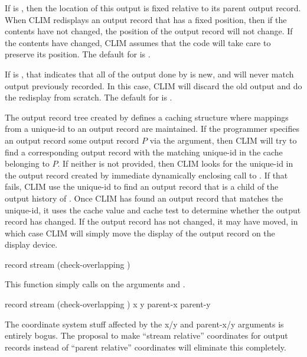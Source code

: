 If  is , then the location of this output is
fixed relative to its parent output record.  When CLIM redisplays an output
record that has a fixed position, then if the contents have not changed, the
position of the output record will not change.  If the contents have changed,
CLIM assumes that the code will take care to preserve its position.  The default
for  is .

If  is , that indicates that all of the output done by
 is new, and will never match output previously recorded.  In this
case, CLIM will discard the old output and do the redisplay from scratch.  The
default for  is .

The output record tree created by  defines a caching
structure where mappings from a unique-id to an output record are maintained.
If the programmer specifies an output record some output record $P$ via the
 argument, then CLIM will try to find a corresponding output
record with the matching unique-id in the cache belonging to $P$.  If neither
 is not provided, then CLIM looks for the unique-id in the
output record created by immediate dynamically enclosing call to
.  If that fails, CLIM use the unique-id to find an output
record that is a child of the output history of .  Once CLIM has
found an output record that matches the unique-id, it uses the cache value and
cache test to determine whether the output record has changed.  If the output
record has not changed, it may have moved, in which case CLIM will simply move
the display of the output record on the display device.


 {record stream \key (check-overlapping )}

This function simply calls  on the arguments
 and .

 {record stream
                                       \optional (check-overlapping ) 
                                                 x y parent-x parent-y}  

 {The coordinate system stuff affected by the x/y and parent-x/y
arguments is entirely bogus.  The proposal to make ``stream relative''
coordinates for output records instead of ``parent relative'' coordinates will
eliminate this completely.}

